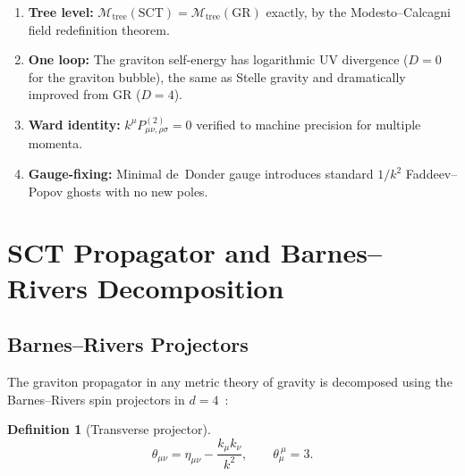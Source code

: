 \documentclass[11pt,a4paper]{article}
\theoremstyle{definition}
\newtheorem{definition}[proposition]{Definition}
\theoremstyle{remark}
\begin{document}
\begin{enumerate}[label=(\roman*)]
  \item \textbf{Tree level:} $\mathcal{M}_{\mathrm{tree}}(\mathrm{SCT})
        = \mathcal{M}_{\mathrm{tree}}(\mathrm{GR})$ exactly, by the
        Modesto--Calcagni field redefinition theorem.
  \item \textbf{One loop:} The graviton self-energy has logarithmic UV
        divergence ($D=0$ for the graviton bubble), the same as Stelle
        gravity and dramatically improved from GR ($D=4$).
  \item \textbf{Ward identity:} $k^\mu P^{(2)}_{\mu\nu,\rho\sigma} = 0$
        verified to machine precision for multiple momenta.
  \item \textbf{Gauge-fixing:} Minimal de~Donder gauge introduces standard
        $1/k^2$ Faddeev--Popov ghosts with no new poles.
\end{enumerate}

\section{SCT Propagator and Barnes--Rivers Decomposition}
\label{sec:propagator}

\subsection{Barnes--Rivers Projectors}

The graviton propagator in any metric theory of gravity is decomposed
using the Barnes--Rivers spin projectors in $d=4$~\cite{BarnesRivers}:

\begin{definition}[Transverse projector]
  \begin{equation}
    \theta_{\mu\nu} = \eta_{\mu\nu} - \frac{k_\mu k_\nu}{k^2},
    \qquad \theta_{\mu}^{\ \mu} = 3.
  \end{equation}
\end{definition}
\end{document}
